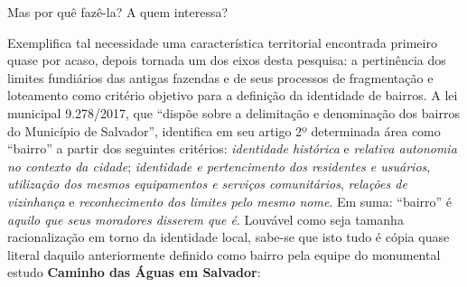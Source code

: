 Mas por quê fazê-la? A quem interessa? 

Exemplifica tal necessidade uma característica territorial encontrada primeiro quase por acaso, depois tornada um dos eixos desta pesquisa: a pertinência dos limites fundiários das antigas fazendas e de seus processos de fragmentação e loteamento como critério objetivo para a definição da identidade de bairros. A lei municipal 9.278/2017, que ``dispõe sobre a delimitação e denominação dos bairros do Município de Salvador'', identifica em seu artigo 2º determinada área como ``bairro'' a partir dos seguintes critérios: \textit{identidade histórica} e \textit{relativa autonomia no contexto da cidade}; \textit{identidade e pertencimento dos residentes e usuários}, \textit{utilização dos mesmos equipamentos e serviços comunitários}, \textit{relações de vizinhança} e \textit{reconhecimento dos limites pelo mesmo nome}. Em suma: ``bairro'' é \textit{aquilo que seus moradores disserem que é}. Louvável como seja tamanha racionalização em torno da identidade local, sabe-se que isto tudo é cópia quase literal daquilo anteriormente definido como bairro pela equipe do monumental estudo \textbf{Caminho das Águas em Salvador}:

